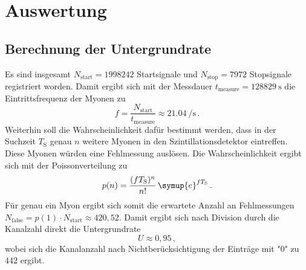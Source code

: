 \section{Auswertung}
\label{sec:Auswertung}

\subsection{Berechnung der Untergrundrate}
\label{sec:unter}
Es sind insgesamt $N_\text{start}=1998242$ Startsignale und
$N_\text{stop}=7972$ Stopsignale registriert worden.
Damit ergibt sich mit der Messdauer $t_\text{measure}=\SI{128829}{\second}$
die Eintrittsfrequenz der Myonen zu
\begin{equation*}
	f = \frac{N_\text{start}}{t_\text{measure}} \approx \SI{21,04}{\per\second} \, \text{.}
\end{equation*}
Weiterhin soll die Wahrscheinlichkeit dafür bestimmt werden, dass in der
Suchzeit $T_\text{S}$ genau $n$ weitere Myonen in den Szintillationsdetektor
eintreffen. Diese Myonen würden eine Fehlmessung auslösen. Die Wahrscheinlichkeit ergibt sich mit der Poissonverteilung zu
\begin{equation*}
	p(n)=\frac{(f T_\text{S})^n}{n!} \, \symup{e}^{f T_\text{S}} \, \text{.}
\end{equation*}
Für genau ein Myon ergibt sich somit die erwartete Anzahl an Fehlmessungen
$N_\text{false}=p(1) \cdot N_\text{start} \approx 420,52$. Damit ergibt sich
nach Division durch die Kanalzahl direkt die Untergrundrate
\begin{equation*}
	U \approx 0,95 \, \mathrm{,}
\end{equation*}
wobei sich die Kanalanzahl nach Nichtberücksichtigung der Einträge mit "$0$" zu $442$ ergibt.
